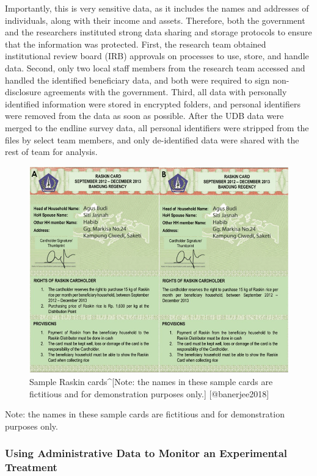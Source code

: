 \documentclass[
]{WileySix}
\begin{document}
Importantly, this is very sensitive data, as it includes the names and addresses of individuals, along with their income and assets. Therefore, both the government and the researchers instituted strong data sharing and storage protocols to ensure that the information was protected. First, the research team obtained institutional review board (IRB) approvals on processes to use, store, and handle data. Second, only two local staff members from the research team accessed and handled the identified beneficiary data, and both were required to sign non-disclosure agreements with the government. Third, all data with personally identified information were stored in encrypted folders, and personal identifiers were removed from the data as soon as possible. After the UDB data were merged to the endline survey data, all personal identifiers were stripped from the files by select team members, and only de-identified data were shared with the rest of team for analysis.

\begin{figure}
\includegraphics[width=1\linewidth]{./assets/indonesia/indonesiafigure1web} \caption{Sample Raskin cards^[Note: the names in these sample cards are fictitious and for demonstration purposes only.] [@banerjee2018]}\label{fig:indonesiafigure1}
\end{figure}

Note: the names in these sample cards are fictitious and for demonstration purposes only.

\hypertarget{using-administrative-data-to-monitor-an-experimental-treatment}{%
\subsubsection{Using Administrative Data to Monitor an Experimental Treatment}\label{using-administrative-data-to-monitor-an-experimental-treatment}}
\end{document}
